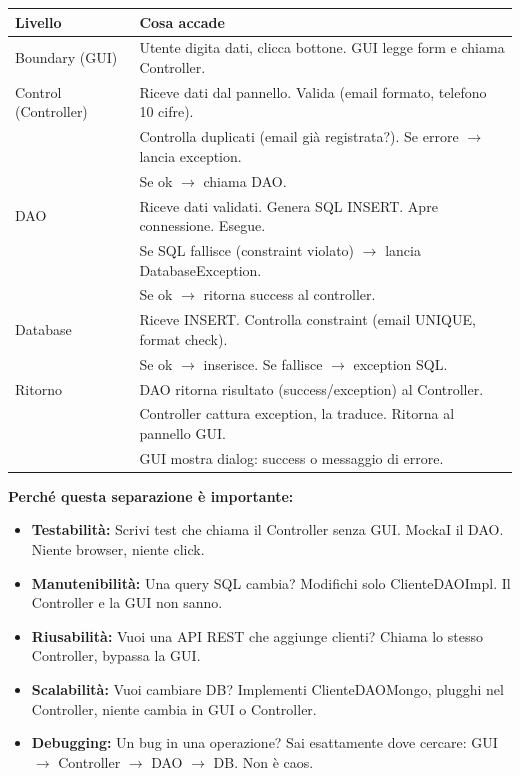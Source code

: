 \documentclass[12pt,a4paper]{article}
\begin{document}
\begin{center}
\begin{tabular}{|l|l|}
\hline
Livello & Cosa accade \\
\hline
Boundary (GUI) & Utente digita dati, clicca bottone. GUI legge form e chiama Controller. \\
\hline
Control (Controller) & Riceve dati dal pannello. Valida (email formato, telefono 10 cifre). \\
& Controlla duplicati (email già registrata?). Se errore $\to$ lancia exception. \\
& Se ok $\to$ chiama DAO. \\
\hline
DAO & Riceve dati validati. Genera SQL INSERT. Apre connessione. Esegue. \\
& Se SQL fallisce (constraint violato) $\to$ lancia DatabaseException. \\
& Se ok $\to$ ritorna success al controller. \\
\hline
Database & Riceve INSERT. Controlla constraint (email UNIQUE, format check). \\
& Se ok $\to$ inserisce. Se fallisce $\to$ exception SQL. \\
\hline
Ritorno & DAO ritorna risultato (success/exception) al Controller. \\
& Controller cattura exception, la traduce. Ritorna al pannello GUI. \\
& GUI mostra dialog: success o messaggio di errore. \\
\hline
\end{tabular}
\end{center}

\textbf{Perché questa separazione è importante:}

\begin{itemize}
  \item \textbf{Testabilità:} Scrivi test che chiama il Controller senza GUI. MockaI il DAO. Niente browser, niente click.
  \item \textbf{Manutenibilità:} Una query SQL cambia? Modifichi solo ClienteDAOImpl. Il Controller e la GUI non sanno.
  \item \textbf{Riusabilità:} Vuoi una API REST che aggiunge clienti? Chiama lo stesso Controller, bypassa la GUI.
  \item \textbf{Scalabilità:} Vuoi cambiare DB? Implementi ClienteDAOMongo, plugghi nel Controller, niente cambia in GUI o Controller.
  \item \textbf{Debugging:} Un bug in una operazione? Sai esattamente dove cercare: GUI $\to$ Controller $\to$ DAO $\to$ DB. Non è caos.
\end{itemize}
\end{document}
